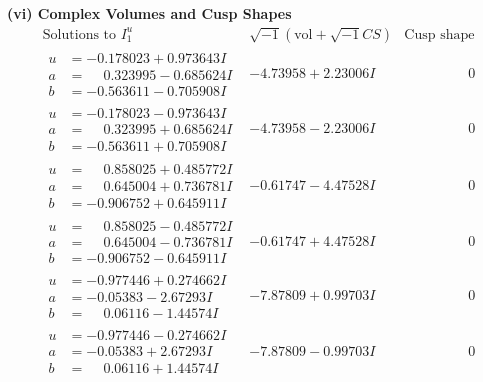 \documentclass[1p]{elsarticle_modified}
\theoremstyle{definition}
\newcommand{\I}{\sqrt{-1}}
\begin{document}
\newpage\flushleft \textbf{(vi) Complex Volumes and Cusp Shapes}
$$\begin{array}{c|c|c}  
\text{Solutions to }I^u_{1}& \I (\text{vol} + \sqrt{-1}CS) & \text{Cusp shape}\\
 \hline 
\begin{aligned}
u &= -0.178023 + 0.973643 I \\
a &= \phantom{-}0.323995 - 0.685624 I \\
b &= -0.563611 - 0.705908 I\end{aligned}
 & -4.73958 + 2.23006 I & \phantom{-0.000000 } 0 \\ \hline\begin{aligned}
u &= -0.178023 - 0.973643 I \\
a &= \phantom{-}0.323995 + 0.685624 I \\
b &= -0.563611 + 0.705908 I\end{aligned}
 & -4.73958 - 2.23006 I & \phantom{-0.000000 } 0 \\ \hline\begin{aligned}
u &= \phantom{-}0.858025 + 0.485772 I \\
a &= \phantom{-}0.645004 + 0.736781 I \\
b &= -0.906752 + 0.645911 I\end{aligned}
 & -0.61747 - 4.47528 I & \phantom{-0.000000 } 0 \\ \hline\begin{aligned}
u &= \phantom{-}0.858025 - 0.485772 I \\
a &= \phantom{-}0.645004 - 0.736781 I \\
b &= -0.906752 - 0.645911 I\end{aligned}
 & -0.61747 + 4.47528 I & \phantom{-0.000000 } 0 \\ \hline\begin{aligned}
u &= -0.977446 + 0.274662 I \\
a &= -0.05383 - 2.67293 I \\
b &= \phantom{-}0.06116 - 1.44574 I\end{aligned}
 & -7.87809 + 0.99703 I & \phantom{-0.000000 } 0 \\ \hline\begin{aligned}
u &= -0.977446 - 0.274662 I \\
a &= -0.05383 + 2.67293 I \\
b &= \phantom{-}0.06116 + 1.44574 I\end{aligned}
 & -7.87809 - 0.99703 I & \phantom{-0.000000 } 0 \\ \hline\begin{aligned}

\end{aligned}
\end{array}$$
\end{document}
